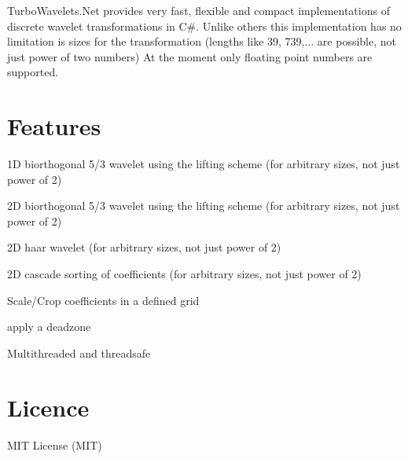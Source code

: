 \-Turbo\-Wavelets.\-Net provides very fast, flexible and compact implementations of discrete wavelet transformations in \-C\#. \-Unlike others this implementation has no limitation is sizes for the transformation (lengths like 39, 739,... are possible, not just power of two numbers) \-At the moment only floating point numbers are supported.\hypertarget{index_Features}{}\section{\-Features}\label{index_Features}

\begin{DoxyItemize}
\item 1\-D biorthogonal 5/3 wavelet using the lifting scheme (for arbitrary sizes, not just power of 2)
\item 2\-D biorthogonal 5/3 wavelet using the lifting scheme (for arbitrary sizes, not just power of 2)
\item 2\-D haar wavelet (for arbitrary sizes, not just power of 2)
\item 2\-D cascade sorting of coefficients (for arbitrary sizes, not just power of 2)
\item \-Scale/\-Crop coefficients in a defined grid
\item apply a deadzone
\item \-Multithreaded and threadsafe
\end{DoxyItemize}\hypertarget{index_Licence}{}\section{\-Licence}\label{index_Licence}
\-M\-I\-T \-License (\-M\-I\-T) 